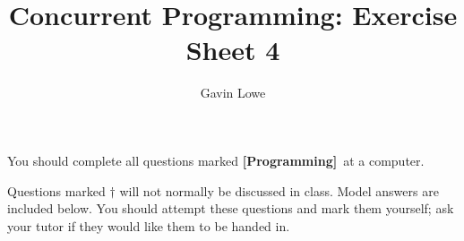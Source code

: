 \documentclass[fleqn,12pt]{article}
\title{Concurrent Programming: Exercise Sheet 4}
\author{Gavin Lowe}
\def\Programming{\textbf{[Programming]}}
\begin{document}
\maketitle


You should complete all questions marked \Programming\ at a computer.

Questions marked $\dagger$ will not normally be discussed in class.  Model
answers are included below.  You should attempt these questions and mark them
yourself; ask your tutor if they would like them to be handed in.


\end{document}

